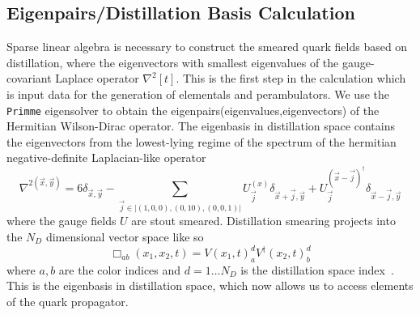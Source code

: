   
\subsection{Eigenpairs/Distillation Basis Calculation}
Sparse linear algebra is necessary to construct the smeared quark fields based on distillation, where the
eigenvectors with smallest eigenvalues of the gauge-covariant Laplace operator $\nabla^2[t]$. 
This is the first step in the calculation which is input data for the generation of elementals and perambulators. We use the \verb|Primme| eigensolver to obtain the eigenpairs(eigenvalues,eigenvectors) of the Hermitian Wilson-Dirac operator\cite{PRIMME}\cite{Frommer:2020ovr}. 
The eigenbasis in distillation space contains the eigenvectors from the lowest-lying regime of the spectrum of the hermitian negative-definite Laplacian-like operator 
\begin{equation}
  \nabla^{2(\vec{x},\vec{y})} = 6\delta_{\vec{x},\vec{y}} - \sum_{\vec{j}\in|(1,0,0),(0,10),(0,0,1)|}^{} U_{\vec{j}}^{(x)}\delta_{\vec{x}+\vec{j},\vec{y}} + U_{\vec{j}}^{(\vec{x}-\vec{j})^\dagger}\delta_{\vec{x}-\vec{j},\vec{y}}
\end{equation}
where the gauge fields $U$ are stout smeared. 
Distillation smearing projects into the $N_D$ dimensional vector space like so 
\begin{equation}
  \Box_{ab}(x_1,x_2,t) = V(x_1,t)^{d}_a V^{\dagger} (x_2,t)^{d}_b
\end{equation} where $a,b$ are the color indices and $d = 1 \dots N_D$ is the distillation space index~\cite{10.5555/3029317}. This is the eigenbasis in distillation space, which now allows us to access elements of the quark propagator.  


